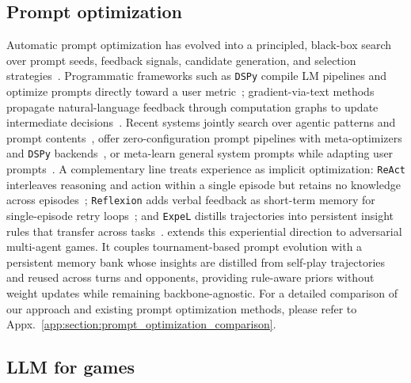 

\subsection{Prompt optimization}
Automatic prompt optimization has evolved into a principled, black-box search over prompt seeds, feedback signals, candidate generation, and selection strategies~\citep{ramnath2025systematic}. Programmatic frameworks such as \texttt{DSPy} compile LM pipelines and optimize prompts directly toward a user metric~\citep{khattab2023dspy};  gradient-via-text methods propagate natural-language feedback through computation graphs to update intermediate decisions~\citep{yuksekgonul2024textgrad}. Recent systems jointly search over agentic patterns and prompt contents~\citep{spiess2025autopdl}, offer zero-configuration prompt pipelines with meta-optimizers and \texttt{DSPy} backends~\citep{murthy2025promptomatix}, or meta-learn general system prompts while adapting user prompts~\citep{choi2025system}. A complementary line treats experience as implicit optimization: \texttt{ReAct} interleaves reasoning and action within a single episode but retains no knowledge across episodes~\citep{yao2022react}; \texttt{Reflexion} adds verbal feedback as short-term memory for single-episode retry loops~\citep{shinn2023reflexion}; and \texttt{ExpeL} distills trajectories into persistent insight rules that transfer across tasks~\citep{zhao2024expel}. \NAME{} extends this experiential direction to adversarial multi-agent games. It couples tournament-based prompt evolution with a persistent memory bank whose insights are distilled from self-play trajectories and reused across turns and opponents, providing rule-aware priors without weight updates while remaining backbone-agnostic. For a detailed comparison of our approach and existing prompt optimization methods, please refer to Appx.~\ref{app:section:prompt_optimization_comparison}.


\subsection{LLM for games}

